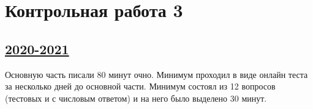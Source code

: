 \newpage
\thispagestyle{empty}
\section{Контрольная работа 3}




\subsection[2020-2021]{\hyperref[sec:sol_kr_03_2020_2021]{2020-2021}}
\label{sec:kr_03_2020_2021}


Основную часть писали 80 минут очно. Минимум проходил в виде онлайн теста за несколько дней до основной части. 
Минимум состоял из 12 вопросов (тестовых и с числовым ответом) и на него было выделено 30 минут.


